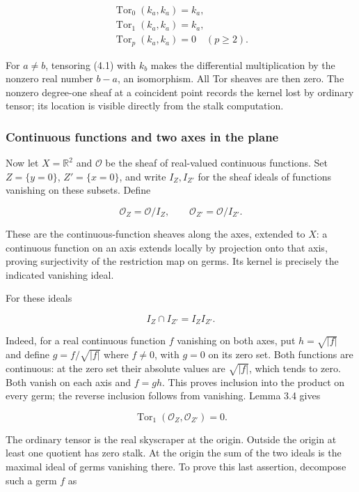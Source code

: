 \documentclass[
  english,
  11pt,
  a4paper,
]{article}
\begin{document}
\[\begin{gathered}
\operatorname{Tor}_0(k_a,k_a)=k_a,\\
\operatorname{Tor}_1(k_a,k_a)=k_a,\\
\operatorname{Tor}_p(k_a,k_a)=0\quad(p\ge2).
\end{gathered}
\tag{4.2}\]

For \(a\ne b\), tensoring (4.1) with \(k_b\) makes the differential
multiplication by the nonzero real number \(b-a\), an isomorphism. All
Tor sheaves are then zero. The nonzero degree-one sheaf at a coincident
point records the kernel lost by ordinary tensor; its location is
visible directly from the stalk computation.

\subsubsection{Continuous functions and two axes in the
plane}\label{derived-tensor-products-and-tor-sheaves--continuous-functions-and-two-axes-in-the-plane}

Now let \(X=\mathbb R^2\) and \(\mathcal O\) be the sheaf of real-valued
continuous functions. Set \(Z=\{y=0\}\), \(Z'=\{x=0\}\), and write
\(I_Z,I_{Z'}\) for the sheaf ideals of functions vanishing on these
subsets. Define

\[\mathcal O_Z=\mathcal O/I_Z,\qquad
\mathcal O_{Z'}=\mathcal O/I_{Z'}.\]

These are the continuous-function sheaves along the axes, extended to
\(X\): a continuous function on an axis extends locally by projection
onto that axis, proving surjectivity of the restriction map on germs.
Its kernel is precisely the indicated vanishing ideal.

For these ideals

\[I_Z\cap I_{Z'}=I_ZI_{Z'}.
\tag{4.3}\]

Indeed, for a real continuous function \(f\) vanishing on both axes, put
\(h=\sqrt{|f|}\) and define \(g=f/\sqrt{|f|}\) where \(f\ne0\), with
\(g=0\) on its zero set. Both functions are continuous: at the zero set
their absolute values are \(\sqrt{|f|}\), which tends to zero. Both
vanish on each axis and \(f=gh\). This proves inclusion into the product
on every germ; the reverse inclusion follows from vanishing. Lemma 3.4
gives

\[\operatorname{Tor}_1(\mathcal O_Z,\mathcal O_{Z'})=0.
\tag{4.4}\]

The ordinary tensor is the real skyscraper at the origin. Outside the
origin at least one quotient has zero stalk. At the origin the sum of
the two ideals is the maximal ideal of germs vanishing there. To prove
this last assertion, decompose such a germ \(f\) as
\end{document}
